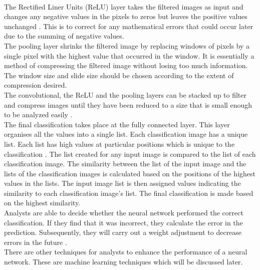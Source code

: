 \\
The Rectified Liner Units (ReLU) layer takes the filtered images as input and changes any negative values in the pixels to zeros but leaves the positive values unchanged \cite{9}. This is to correct for any mathematical errors that could occur later due to the summing of negative values.\newline
\\
The pooling layer shrinks the filtered image by replacing windows of pixels by a single pixel with the highest value that occurred in the window. It is essentially a method of compressing the filtered image without losing too much information. The window size and slide size should be chosen according to the extent of compression desired.\newline
\\
The convolutional, the ReLU and the pooling layers can be stacked up to filter and compress images until they have been reduced to a size that is small enough to be analyzed easily \cite{11}. \newline
\\
The final classification takes place at the fully connected layer. This layer organises all the values into a single list. Each classification image has a unique list. Each list has high values at particular positions which is unique to the classification \cite{10}. The list created for any input image is compared to the list of each classification image. The similarity between the list of the input image and the lists of the classification images is calculated based on the positions of the highest values in the lists. The input image list is then assigned values indicating the similarity to each classification image’s list. The final classification is made based on the highest similarity.\newline
\\
Analysts are able to decide whether the neural network performed the correct classification. If they find that it was incorrect, they calculate the error in the prediction. Subsequently, they will carry out a weight adjustment to decrease errors in the future \cite{11}.\newline
\\
There are other techniques for analysts to enhance the performance of a neural network. These are machine learning techniques which will be discussed later.
